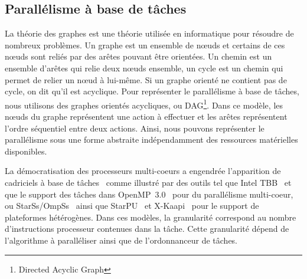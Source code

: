 \subsection{Parallélisme à base de tâches}
La théorie des graphes est une théorie utilisée en informatique pour résoudre de nombreux problèmes.
%
Un graphe est un ensemble de n{\oe}uds et certains de ces n{\oe}uds sont reliés par des arêtes pouvant être orientées.
%
Un chemin est un ensemble d'arêtes qui relie deux n{\oe}uds ensemble, un cycle est un chemin qui permet de relier un n{\oe}ud à lui-même.
Si un graphe orienté ne contient pas de cycle, on dit qu'il est acyclique.
%
Pour représenter le parallélisme à base de tâches, nous utilisons des graphes orientés acycliques, ou DAG\footnote{Directed Acyclic Graph}.
%
Dans ce modèle, les n{\oe}uds du graphe représentent une action à effectuer et les arêtes représentent l'ordre séquentiel entre deux actions.
%
Ainsi, nous pouvons représenter le parallélisme sous une forme abstraite indépendamment des ressources matérielles disponibles.


La démocratisation des processeurs multi-coeurs a engendrée l'apparition de cadriciels à base de tâches~\cite{taskscomparison} comme illustré par des outils tel que Intel TBB~\cite{Intel::TBB} et que le support des tâches dans OpenMP~3.0~\cite{openmptasks} pour du parallélisme multi-coeur, ou StarSs/OmpSs~\cite{OMPSs} ainsi que StarPU~\cite{starpu} et X-Kaapi~\cite{xkaapi} pour le support de plateformes hétérogènes.
%
Dans ces modèles, la granularité correspond au nombre d'instructions processeur contenues dans la tâche.
%
Cette granularité dépend de l'algorithme à paralléliser ainsi que de l'ordonnanceur de tâches.
